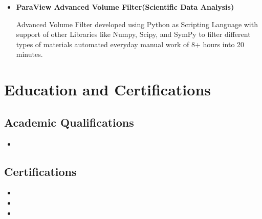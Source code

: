 \documentclass[11pt,a4paper,sans]{moderncv}        %
\begin{document}
{\begin{itemize}
\item{\textbf{ParaView Advanced Volume Filter(Scientific Data Analysis)}

\vspace{3pt}

\small{Advanced Volume Filter developed using Python as Scripting Language
with support of other Libraries like Numpy, Scipy, and SymPy to filter different types of materials automated everyday manual work of 8+ hours into 20 minutes.
}}

\end{itemize}

\section{Education and Certifications}

\vspace{5pt}

\subsection{Academic Qualifications}

\vspace{5pt}

\begin{itemize}

\item{}

\end{itemize}


\subsection{Certifications}

\vspace{5pt}

\begin{itemize}

\item{}

\item{}

\item{}


\end{itemize}}
\end{document}
